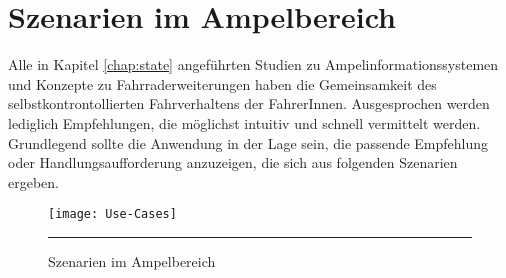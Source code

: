\chapter{\label{chap:szenarien}Szenarien im Ampelbereich}
Alle in Kapitel \ref{chap:state} angeführten Studien zu Ampelinformationssystemen und Konzepte zu Fahrraderweiterungen haben die Gemeinsamkeit des selbstkontrontollierten Fahrverhaltens der FahrerInnen. Ausgesprochen werden lediglich Empfehlungen, die möglichst intuitiv und schnell vermittelt werden. Grundlegend sollte die Anwendung in der Lage sein, die passende Empfehlung oder Handlungsaufforderung anzuzeigen, die sich aus folgenden Szenarien ergeben.
\begin{figure}[H]  
    \centering  
    \texttt{[image: Use-Cases]} 
    \rule{35em}{0.5pt}
    \caption[Szenarien]{Szenarien im Ampelbereich}
    \label{fig:szenarien}
\end{figure}

